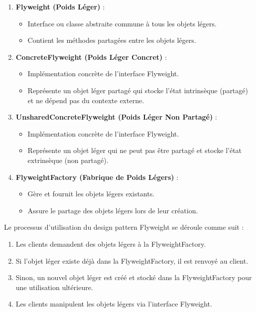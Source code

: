\documentclass[french]{article}
\begin{document}
\begin{enumerate}
    \item \textbf{Flyweight (Poids Léger)} :
    \begin{itemize}
        \item Interface ou classe abstraite commune à tous les objets légers.
        \item Contient les méthodes partagées entre les objets légers.
    \end{itemize}
    
    \item \textbf{ConcreteFlyweight (Poids Léger Concret)} :
    \begin{itemize}
        \item Implémentation concrète de l'interface Flyweight.
        \item Représente un objet léger partagé qui stocke l'état intrinsèque (partagé) et ne dépend pas du contexte externe.
    \end{itemize}
    
    \item \textbf{UnsharedConcreteFlyweight (Poids Léger Non Partagé)} :
    \begin{itemize}
        \item Implémentation concrète de l'interface Flyweight.
        \item Représente un objet léger qui ne peut pas être partagé et stocke l'état extrinsèque (non partagé).
    \end{itemize}
    
    \item \textbf{FlyweightFactory (Fabrique de Poids Légers)} :
    \begin{itemize}
        \item Gère et fournit les objets légers existants.
        \item Assure le partage des objets légers lors de leur création.
    \end{itemize}
\end{enumerate}

Le processus d'utilisation du design pattern Flyweight se déroule comme suit :

\begin{enumerate}
    \item Les clients demandent des objets légers à la FlyweightFactory.
    \item Si l'objet léger existe déjà dans la FlyweightFactory, il est renvoyé au client.
    \item Sinon, un nouvel objet léger est créé et stocké dans la FlyweightFactory pour une utilisation ultérieure.
    \item Les clients manipulent les objets légers via l'interface Flyweight.
\end{enumerate}
\end{document}

